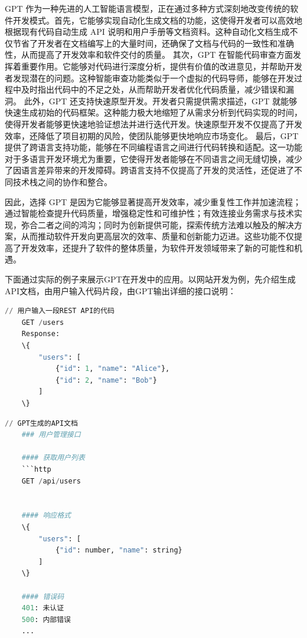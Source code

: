 GPT 作为一种先进的人工智能语言模型，正在通过多种方式深刻地改变传统的软件开发模式。首先，它能够实现自动化生成文档的功能，这使得开发者可以高效地根据现有代码自动生成 API 说明和用户手册等文档资料。这种自动化文档生成不仅节省了开发者在文档编写上的大量时间，还确保了文档与代码的一致性和准确性，从而提高了开发效率和软件交付的质量。
其次，GPT 在智能代码审查方面发挥着重要作用。它能够对代码进行深度分析，提供有价值的改进意见，并帮助开发者发现潜在的问题。这种智能审查功能类似于一个虚拟的代码导师，能够在开发过程中及时指出代码中的不足之处，从而帮助开发者优化代码质量，减少错误和漏洞。
此外，GPT 还支持快速原型开发。开发者只需提供需求描述，GPT 就能够快速生成初始的代码框架。这种能力极大地缩短了从需求分析到代码实现的时间，使得开发者能够更快速地验证想法并进行迭代开发。快速原型开发不仅提高了开发效率，还降低了项目初期的风险，使团队能够更快地响应市场变化。
最后，GPT 提供了跨语言支持功能，能够在不同编程语言之间进行代码转换和适配。这一功能对于多语言开发环境尤为重要，它使得开发者能够在不同语言之间无缝切换，减少了因语言差异带来的开发障碍。跨语言支持不仅提高了开发的灵活性，还促进了不同技术栈之间的协作和整合。

因此，选择 GPT 是因为它能够显著提高开发效率，减少重复性工作并加速流程；通过智能检查提升代码质量，增强稳定性和可维护性；有效连接业务需求与技术实现，弥合二者之间的鸿沟；同时为创新提供可能，探索传统方法难以触及的解决方案，从而推动软件开发向更高层次的效率、质量和创新能力迈进。这些功能不仅提高了开发效率，还提升了软件的整体质量，为软件开发领域带来了新的可能性和机遇。

下面通过实际的例子来展示GPT在开发中的应用。以网站开发为例，先介绍生成API文档，由用户输入代码片段，由GPT输出详细的接口说明：

\begin{promptbox}
\small{
\begin{lstlisting}[language=Python]
    // 用户输入一段REST API的代码
    GET /users
    Response:
    \{
        "users": [
            {"id": 1, "name": "Alice"},
            {"id": 2, "name": "Bob"}
        ]
    \}
\end{lstlisting}}
\end{promptbox}

\begin{gptbox}
\small{
\begin{lstlisting}[language=Python]
    // GPT生成的API文档
    ### 用户管理接口
    
    #### 获取用户列表
    ```http
    GET /api/users
    
    
    #### 响应格式
    \{
        "users": [
            {"id": number, "name": string}
        ]
    \}

    #### 错误码
    401: 未认证
    500: 内部错误
    ...
\end{lstlisting}
}
\end{gptbox}


